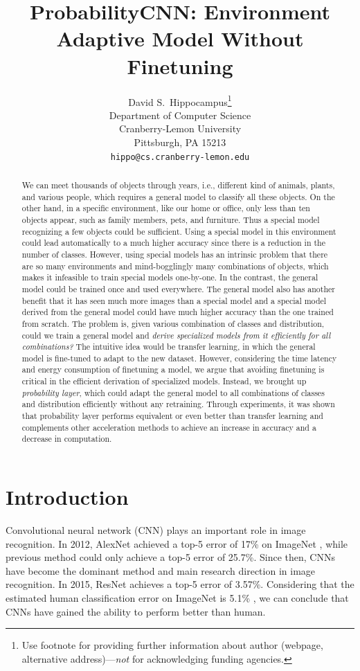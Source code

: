 \documentclass{article}
\title{ProbabilityCNN: Environment Adaptive Model Without Finetuning}
\author{
  David S.~Hippocampus\thanks{Use footnote for providing further
    information about author (webpage, alternative
    address)---\emph{not} for acknowledging funding agencies.} \\
  Department of Computer Science\\
  Cranberry-Lemon University\\
  Pittsburgh, PA 15213 \\
  \texttt{hippo@cs.cranberry-lemon.edu} \\
}
\begin{document}

\maketitle


\begin{abstract}
 We can meet thousands of objects through years, i.e., different kind of animals, plants, and various people, which requires a general model to classify all these objects. On the other hand, in a specific environment, like our home or office, only less than ten objects appear, such as family members, pets, and furniture. Thus a special model recognizing a few objects could be sufficient. Using a special model in this environment could lead automatically to a much higher accuracy since there is a reduction in the number of classes. However, using special models has an intrinsic problem that there are so many environments and mind-bogglingly many combinations of objects, which makes it infeasible to train special models one-by-one. In the contrast, the general model could be trained once and used everywhere. The general model also has another benefit that it has seen much more images than a special model and a special model derived from the general model could have much higher accuracy than the one trained from scratch. The problem is, given various combination of classes and distribution, could we train a general model and \textit{derive specialized models from it efficiently for all combinations?} The intuitive idea would be transfer learning, in which the general model is fine-tuned to adapt to the new dataset. However, considering the time latency and energy consumption of finetuning a model, we argue that avoiding finetuning is critical in the efficient derivation of specialized models. Instead, we brought up \textit{probability layer}, which could adapt the general model to all combinations of classes and distribution efficiently without any retraining. Through experiments, it was shown that probability layer performs equivalent or even better than transfer learning and complements other acceleration methods to achieve an increase in accuracy and a decrease in computation.
\end{abstract}


\section{Introduction}
Convolutional neural network (CNN) plays an important role in image recognition. In 2012, AlexNet \cite{krizhevsky2012imagenet} achieved a top-5 error of 17\% on ImageNet \cite{deng2009imagenet}, while previous method could only achieve a top-5 error of 25.7\%. Since then, CNNs have become the dominant method and main research direction in image recognition. In 2015, ResNet \cite{he2016deep} achieves a top-5 error of 3.57\%. Considering that the estimated human classification error on ImageNet is 5.1\% \cite{russakovsky2015imagenet}, we can conclude that CNNs have gained the ability to perform better than human. 
\end{document}
